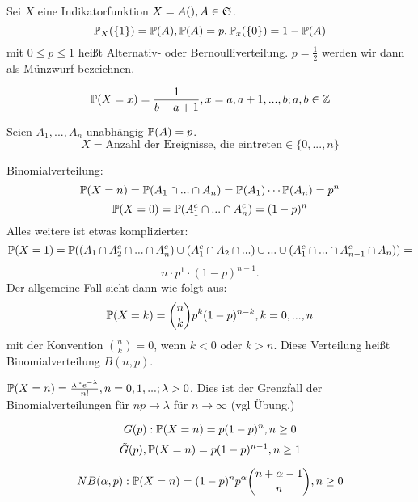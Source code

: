			\begin{defi}
				Sei $X$ eine Indikatorfunktion $X=A(), A\in\mf{S}$. 
				\[ \P_X(\{1\})=\P(A), \P(A)=p,\P_x(\{0\})=1-\P(A) \]
				mit $0\le p\le 1$ heißt Alternativ- oder Bernoulliverteilung. $p=\frac{1}{2}$ werden wir dann als Münzwurf bezeichnen. 
			\end{defi}
			
			\begin{defi}
				
				\[ \P(X=x)=\frac{1}{b-a+1}, x=a,a+1,...,b; a,b\in\Z \]
			\end{defi}
			
			\begin{defi}[Binomialverteilung]
				Seien $A_1,...,A_n$ unabhängig $\P(A)=p$. 
				\[ X=\text{Anzahl der Ereignisse, die eintreten}\in\{0,...,n\} \]
			\end{defi}
			
			\begin{bsp}
				Binomialverteilung: 
				\[ \P(X=n)=\P(A_1\cap ...\cap A_n)=\P(A_1)\cdots\P(A_n)=p^n \]
				\[ \P(X=0)=\P(A_1^c\cap...\cap A_n^c)=(1-p)^n \]
				Alles weitere ist etwas komplizierter:
				\[ \P(X=1)=\P((A_1\cap A_2^c\cap...\cap A_n^c)\cup(A_1^c\cap A_2\cap ...)\cup...\cup(A_1^c\cap...\cap A_{n-1}^c\cap A_n))= \]
				\[ n\cdot p^1\cdot (1-p)^{n-1}. \]
				Der allgemeine Fall sieht dann wie folgt aus:
				\[ \P(X=k)=\binom{n}{k}p^k (1-p)^{n-k}, k=0,...,n \]
				mit der Konvention $\binom{n}{k}=0$, wenn $k<0$ oder $k>n$. Diese Verteilung heißt Binomialverteilung $B(n,p)$. 
			\end{bsp}
			
			\begin{defi}
				$\P(X=n)=\frac{\lambda^ne^{-\lambda}}{n!}, n=0,1,...; \lambda>0$. Dies ist der Grenzfall der Binomialverteilungen für $np\to \lambda$ für $n\to\infty$ (vgl Übung.)
			\end{defi}
			
			\begin{defi}
				\[G(p): \P(X=n)=p(1-p)^n, n\ge 0\] 
				\[\tilde{G}(p), \P(X=n)=p(1-p)^{n-1}, n\ge 1\]
			\end{defi}
			
			\begin{defi}
				\[ NB(\alpha,p): \P(X=n)=(1-p)^np^\alpha\binom{n+\alpha-1}{n}, n\ge 0 \]
				
			\end{defi}
